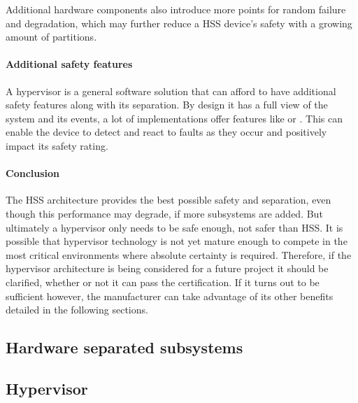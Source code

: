Additional hardware components also introduce more points for random failure and degradation, which may further reduce a \gls{HSS} device's safety with a growing amount of partitions.

\paragraph{Additional safety features}
A hypervisor is a general software solution that can afford to have additional safety features along with its separation. By design it has a full view of the system and its events, a lot of implementations offer features like  or . This can enable the device to detect and react to faults as they occur and positively impact its safety rating.

\paragraph{Conclusion}
The \gls{HSS} architecture provides the best possible safety and separation, even though this performance may degrade, if more subsystems are added. But ultimately a hypervisor only needs to be safe enough, not safer than \gls{HSS}. It is possible that hypervisor technology is not yet mature enough to compete in the most critical environments where absolute certainty is required. Therefore, if the hypervisor architecture is being considered for a future project it should be clarified, whether or not it can pass the certification. If it turns out to be sufficient however, the manufacturer can take advantage of its other benefits detailed in the following sections.

\subsection{Hardware separated subsystems}
\subsection{Hypervisor}


